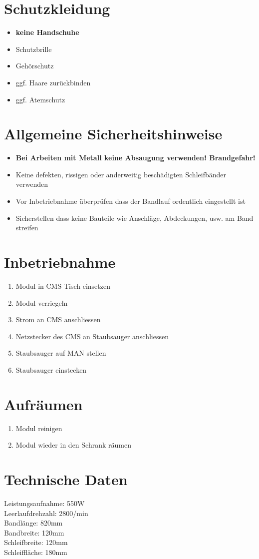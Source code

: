 \documentclass[10pt]{scrartcl}
\date{\vspace{-5ex}}
\title{\flushleft{FESTOOL Bandschleifer BS 120}}
\begin{document}
\maketitle
\thispagestyle{fancy}
\section{Schutzkleidung}
\begin{itemize}
\item \textbf{keine Handschuhe}
\item Schutzbrille
\item Gehörschutz
\item ggf. Haare zurückbinden 
\item ggf. Atemschutz 
\end{itemize}
\section{Allgemeine Sicherheitshinweise}
\begin{itemize}
\item \textbf{Bei Arbeiten mit Metall keine Absaugung verwenden! Brandgefahr!}
\item Keine defekten, rissigen oder anderweitig beschädigten Schleifbänder verwenden 
\item Vor Inbetriebnahme überprüfen dass der Bandlauf ordentlich eingestellt ist
\item Sicherstellen dass keine Bauteile wie Anschläge, Abdeckungen, usw. am Band streifen
\end{itemize}

\section{Inbetriebnahme}
\begin{enumerate}
\item Modul in CMS Tisch einsetzen
\item Modul verriegeln
\item Strom an CMS anschliessen
\item Netzstecker des CMS an Staubsauger anschliessen
\item Staubsauger auf MAN stellen
\item Staubsauger einstecken
\end{enumerate}

\section{Aufräumen}
\begin{enumerate}
\item Modul reinigen
\item Modul wieder in den Schrank räumen
\end{enumerate}

\section{Technische Daten}
Leistungsaufnahme: 550W\\
Leerlaufdrehzahl: 2800/min\\
Bandlänge: 820mm\\
Bandbreite: 120mm\\
Schleifbreite: 120mm\\
Schleiffläche: 180mm\\


\end{document}
